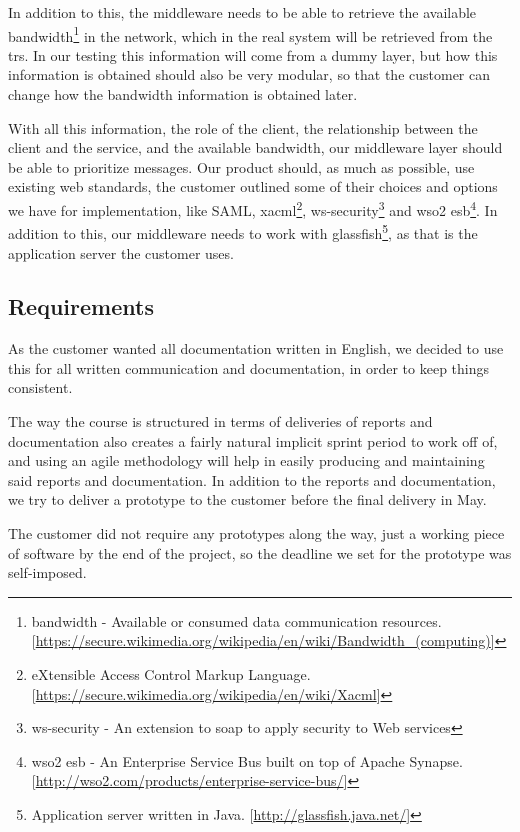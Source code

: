     In addition to this, the middleware needs to be able to retrieve the available \gls{bandwidth}\footnote{\Gls{bandwidth} - Available or consumed data communication resources.[\url{https://secure.wikimedia.org/wikipedia/en/wiki/Bandwidth_(computing)}]} in the network, which in the real system will be retrieved from the \glspl{tr}. In our testing this information will come from a dummy layer, but how this information is obtained should also be very modular, so that the customer can change how the bandwidth information is obtained later.

    With all this information, the role of the client, the relationship between the client and the service, and the available bandwidth, our middleware layer should be able to prioritize messages. Our product should, as much as possible, use existing web standards, the customer outlined some of their choices and options we have for implementation, like SAML, \gls{xacml}\footnote{eXtensible Access Control Markup Language. [\url{https://secure.wikimedia.org/wikipedia/en/wiki/Xacml}]}, \gls{ws-security}\footnote{\gls{ws-security} - An extension to \gls{soap} to apply security to Web services} and \gls{wso2 esb}\footnote{\gls{wso2 esb} - An Enterprise Service Bus built on top of Apache Synapse. [\url{http://wso2.com/products/enterprise-service-bus/}]}. In addition to this, our middleware needs to work with \gls{glassfish}\footnote{Application server written in Java. [\url{http://glassfish.java.net/}]}, as that is the application server the customer uses.
   
    \subsection{Requirements}\label{Requirements}
    As the customer wanted all documentation written in English, we decided to use this for all written communication and documentation, in order to keep things consistent.
    
    The way the course is structured in terms of deliveries of reports and documentation also creates a fairly natural implicit sprint period to work off of, and using an agile methodology will help in easily producing and maintaining said reports and documentation. In addition to the  reports and documentation, we try to deliver a prototype to the customer before the final delivery in May.

    The customer did not require any prototypes along the way, just a working piece of software by the end of the project, so the deadline we set for the prototype was self-imposed. 

